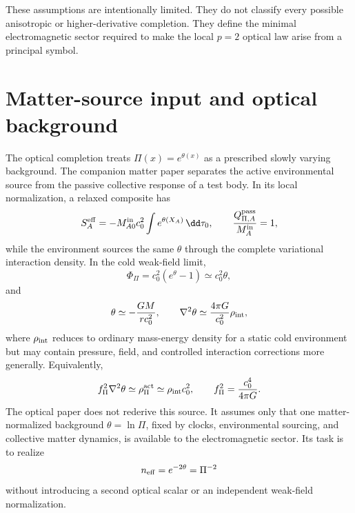 \documentclass[12pt]{article}
\begin{document}
These assumptions are intentionally limited.  They do not classify every possible anisotropic or higher-derivative completion.  They define the minimal electromagnetic sector required to make the local $p=2$ optical law arise from a principal symbol.



\section{Matter-source input and optical background}
\label{sec:loading}

The optical completion treats \(\Pi(x)=e^{\theta(x)}\) as a prescribed slowly varying background.  The companion matter paper separates the active environmental source from the passive collective response of a test body.  In its local normalization, a relaxed composite has
\begin{equation}
    S_A^{\rm eff}=-M_{A0}^{\rm in}c_0^2\int e^{\theta(X_A)}\,\dd\tau_0,
    \qquad
    \frac{Q_{\Pi,A}^{\rm pass}}{M_A^{\rm in}}=1,
    \label{eq:source-input-collective-action}
\end{equation}
while the environment sources the same \(\theta\) through the complete variational interaction density.  In the cold weak-field limit,
\begin{equation}
    \Phi_\Pi=c_0^2(e^\theta-1)\simeq c_0^2\theta,
    \label{eq:source_input_phi}
\end{equation}
and
\begin{equation}
    \theta\simeq -\frac{GM}{rc_0^2},
    \qquad
    \nabla^2\theta\simeq\frac{4\pi G}{c_0^2}\rho_{\rm int},
    \label{eq:source_input_poisson}
\end{equation}
where \(\rho_{\rm int}\) reduces to ordinary mass-energy density for a static cold environment but may contain pressure, field, and controlled interaction corrections more generally.  Equivalently,
\begin{equation}
    f_\Pi^2\nabla^2\theta\simeq\rho_\Pi^{\rm act}
    \simeq\rho_{\rm int}c_0^2,
    \qquad
    f_\Pi^2=\frac{c_0^4}{4\pi G}.
    \label{eq:source_input_scalar}
\end{equation}
The optical paper does not rederive this source.  It assumes only that one matter-normalized background \(\theta=\ln\Pi\), fixed by clocks, environmental sourcing, and collective matter dynamics, is available to the electromagnetic sector.  Its task is to realize
\begin{equation}
    n_{\rm eff}=e^{-2\theta}=\Pi^{-2}
    \label{eq:source_input_optical_target}
\end{equation}
without introducing a second optical scalar or an independent weak-field normalization.
\end{document}

